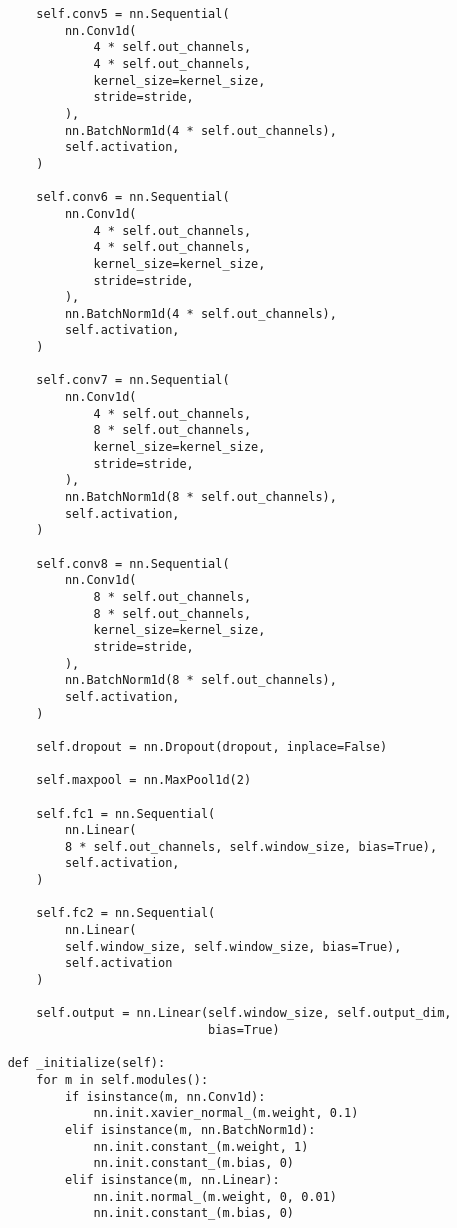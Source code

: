 \documentclass[
thesis  %
]{csthes}
\begin{document}
\begin{lstlisting}
        self.conv5 = nn.Sequential(
            nn.Conv1d(
                4 * self.out_channels,
                4 * self.out_channels,
                kernel_size=kernel_size,
                stride=stride,
            ),
            nn.BatchNorm1d(4 * self.out_channels),
            self.activation,
        )

        self.conv6 = nn.Sequential(
            nn.Conv1d(
                4 * self.out_channels,
                4 * self.out_channels,
                kernel_size=kernel_size,
                stride=stride,
            ),
            nn.BatchNorm1d(4 * self.out_channels),
            self.activation,
        )

        self.conv7 = nn.Sequential(
            nn.Conv1d(
                4 * self.out_channels,
                8 * self.out_channels,
                kernel_size=kernel_size,
                stride=stride,
            ),
            nn.BatchNorm1d(8 * self.out_channels),
            self.activation,
        )

        self.conv8 = nn.Sequential(
            nn.Conv1d(
                8 * self.out_channels,
                8 * self.out_channels,
                kernel_size=kernel_size,
                stride=stride,
            ),
            nn.BatchNorm1d(8 * self.out_channels),
            self.activation,
        )

        self.dropout = nn.Dropout(dropout, inplace=False)

        self.maxpool = nn.MaxPool1d(2)

        self.fc1 = nn.Sequential(
            nn.Linear(
            8 * self.out_channels, self.window_size, bias=True),
            self.activation,
        )

        self.fc2 = nn.Sequential(
            nn.Linear(
            self.window_size, self.window_size, bias=True),
            self.activation
        )

        self.output = nn.Linear(self.window_size, self.output_dim,
                                bias=True)

    def _initialize(self):
        for m in self.modules():
            if isinstance(m, nn.Conv1d):
                nn.init.xavier_normal_(m.weight, 0.1)
            elif isinstance(m, nn.BatchNorm1d):
                nn.init.constant_(m.weight, 1)
                nn.init.constant_(m.bias, 0)
            elif isinstance(m, nn.Linear):
                nn.init.normal_(m.weight, 0, 0.01)
                nn.init.constant_(m.bias, 0)


\end{lstlisting}
\end{document}
